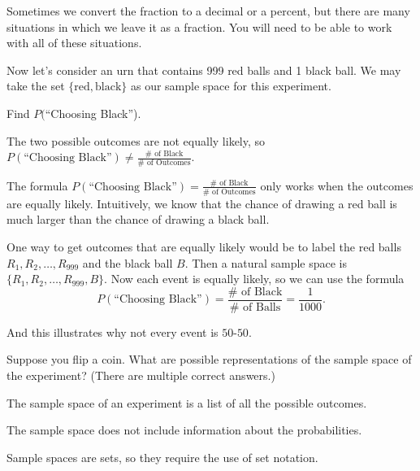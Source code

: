 \documentclass{ximera}
\begin{document}
Sometimes we convert the fraction to a decimal or a percent, but there are many situations in which we leave it as a fraction. You will need to be able to work with all of these situations.

Now let's consider an urn that contains 999 red balls and 1 black ball. We may take the set $\{ \text{red}, \text{black} \}$ as our sample space for this experiment. 

\begin{question}
Find $P($``Choosing Black'').

    \begin{multipleChoice}
      \end{multipleChoice}
    \begin{hint}
    The two possible outcomes are not equally likely, so $P(\text{``Choosing Black''})\ne\frac{\#\text{ of Black}}{\#\text{ of Outcomes}}$.
    \end{hint}

\end{question}

The formula $P(\text{``Choosing Black''})=\frac{\#\text{ of Black}}{\#\text{ of Outcomes}}$ only works when the outcomes are equally likely. 
Intuitively, we know that the chance of drawing a red ball is much larger than the chance of drawing a black ball. 

One way to get outcomes that are equally likely would be to label the red balls $R_1,R_2,\ldots, R_{999}$ and the black ball $B$. Then a natural sample space is $\{R_1,R_2,\ldots,R_{999},B\}$. Now each event is equally likely, so we can use the formula 
$$
P(\text{``Choosing Black''})=\frac{\text{$\#$ of Black}}{\text{$\#$ of Balls}}=\frac{1}{1000}.
$$

And this illustrates why not every event is $50$-$50$.


\begin{question}
Suppose you flip a coin. What are possible representations of the sample space of the experiment? (There are multiple correct answers.)

    \begin{multipleChoice}
      \end{multipleChoice}
    \begin{hint}
    The sample space of an experiment is a list of all the possible outcomes.
    \end{hint}
    \begin{hint}
    The sample space does not include information about the probabilities.
    \end{hint}
    \begin{hint}
    Sample spaces are sets, so they require the use of set notation.
    \end{hint}

\end{question}
\end{document}
